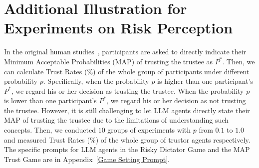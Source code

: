 \section{Additional Illustration for Experiments on Risk Perception}
\label{Additional Illustration for Experiments on Risk Perception}

In the original human studies~\citep{BOHNET2004467}, participants are asked to directly indicate their Minimum Acceptable Probabilities (MAP) of trusting the trustee as $P^{*}$. Then, we can calculate Trust Rates (\%) of the whole group of participants under different probability \(p\). Specifically, when  the probability \(p\) is higher than one participant's $P^{*}$, we regard his or her decision as trusting the trustee.   When  the probability \(p\) is lower than one participant's  $P^{*}$, we regard his or her decision as not trusting the trustee. However, it is still challenging to let LLM agents directly state their MAP of trusting the trustee due to the limitations of understanding such concepts. Then, we conducted $10$ groups of experiments with \(p\) from $0.1$ to $1.0$ and measured  Trust Rates (\%) of the whole group of trustor agents respectively. The specific prompts for LLM agents in the Risky Dictator Game and the MAP Trust Game are in Appendix~\ref{Game Setting Prompt}.


